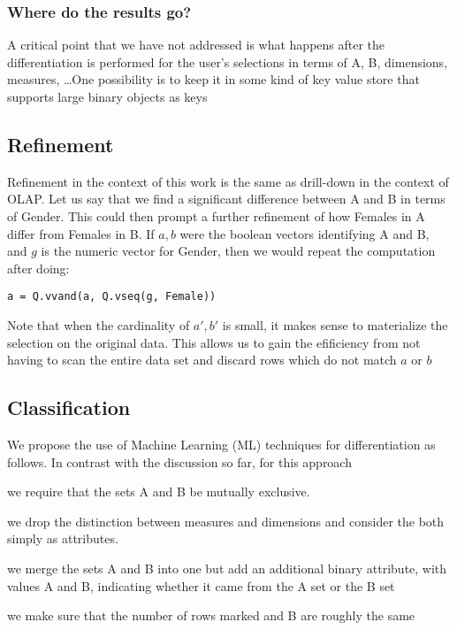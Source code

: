 \subsubsection{Where do the results go?}

A critical point that we have not addressed is what happens after the
differentiation is performed for the user's selections in terms of A, B,
dimensions, measures, \ldots One possibility is to keep it in some kind of key
value store that supports large binary objects as keys

\TBC



\subsection{Refinement}
\label{Refinement}

Refinement in the context of this work is the same as drill-down in the context of OLAP. 
Let us say that we find a significant difference between A and B in terms of
Gender. This could then prompt a further refinement of how Females in A differ
from Females in B. If \(a, b\) were the boolean vectors identifying A and B,
and \(g\) is the numeric vector for Gender,
then we would repeat the computation after doing:
\begin{verbatim}
a = Q.vvand(a, Q.vseq(g, Female))
\end{verbatim}

Note that when the cardinality of \(a', b'\) is small, it makes sense 
to materialize the selection on the original data. This allows us to gain the
efificiency from not having to scan the entire data set and discard rows which
do not match \(a\) or \(b\)

\subsection{Classification}
\label{Classification}

We propose the use of Machine Learning (ML) techniques for differentiation as
follows. 
In contrast with the discussion so far, for this approach
\be
\item we require that the sets A and B be mutually exclusive.
\item we drop the distinction between measures and dimensions and
consider the both simply as attributes.
\item we merge the sets A and B into one but add an additional 
binary attribute, with values A and B, indicating whether it came from the A set
or the B set
\item we make sure that the number of rows marked and B are roughly the same
\ee

